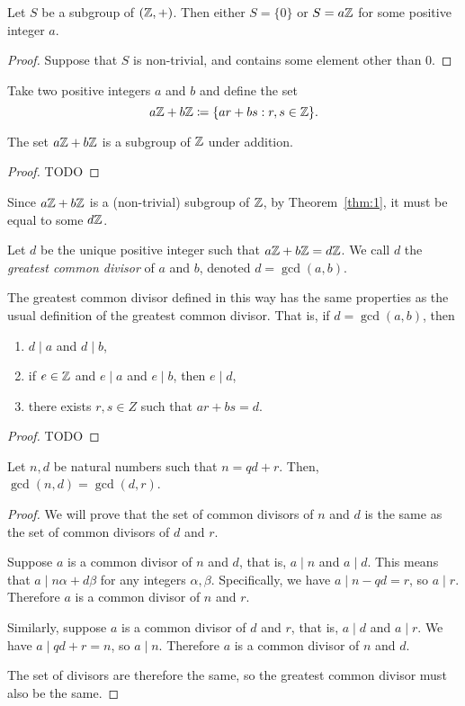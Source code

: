 \begin{theorem}\label{thm:1}
  Let $S$ be a subgroup of $(\mathbb{Z}, +)$. Then either $S = \{0\}$ or $S = a\mathbb{Z}$ for some positive integer $a$.
\end{theorem}
\begin{proof}
  Suppose that $S$ is non-trivial, and contains some element other than $0$.
\end{proof}

Take two positive integers $a$ and $b$ and define the set \[
  a\mathbb{Z} + b\mathbb{Z} \coloneq \{ar + bs: r, s \in \mathbb{Z}\}.
\] 
\begin{proposition}
  The set $a\mathbb{Z} + b\mathbb{Z}$ is a subgroup of  $\mathbb{Z}$ under addition.
\end{proposition}
\begin{proof}
  TODO
\end{proof}

Since $a\mathbb{Z} + b\mathbb{Z}$ is a (non-trivial) subgroup of  $\mathbb{Z}$, by Theorem~\ref{thm:1}, it must be equal to some $d\mathbb{Z}$.

\begin{definition}
  Let $d$ be the unique positive integer such that $a\mathbb{Z} + b\mathbb{Z} = d\mathbb{Z}$. We call $d$ the \emph{greatest common divisor} of $a$ and $b$, denoted $d = \gcd(a, b)$.
\end{definition}

\begin{proposition}
  The greatest common divisor defined in this way has the same properties as the usual definition of the greatest common divisor. That is, if $d = \gcd(a, b)$, then 
  \begin{enumerate}
    \item $d \mid a$ and  $d \mid b$,
    \item if  $e \in \mathbb{Z}$ and $e \mid a$ and  $e \mid b$, then  $e \mid d$,
    \item there exists  $r, s \in Z$ such that $ar + bs = d$.
  \end{enumerate}
\end{proposition}
\begin{proof}
  TODO
\end{proof}

\begin{proposition}
  Let $n, d$ be natural numbers such that  $n = qd + r$. Then, $\gcd(n, d) = \gcd(d, r)$.
\end{proposition}
\begin{proof}
  We will prove that the set of common divisors of $n$ and $d$ is the same as the set of common divisors of $d$ and $r$.

  Suppose $a$ is a common divisor of $n$ and $d$, that is, $a \mid n$ and $a \mid d$. This means that $a \mid n\alpha + d\beta$ for any integers $\alpha, \beta$. Specifically, we have $a \mid n - qd = r$, so $a \mid r$. Therefore $a$ is a common divisor of $n$ and $r$.

  Similarly, suppose $a$ is a common divisor of $d$ and $r$, that is, $a \mid d$ and $a \mid r$. We have $a \mid qd + r = n$, so $a \mid n$. Therefore $a$ is a common divisor of $n$ and $d$.

  The set of divisors are therefore the same, so the greatest common divisor must also be the same.
\end{proof}

